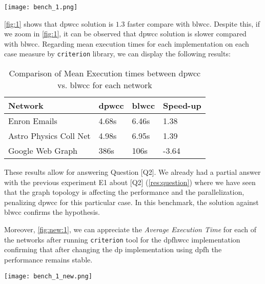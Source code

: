 \begin{minipage}[t]{\linewidth}
  \texttt{[image: bench\_1.png]}
  \captionsetup{type=figure}
  \label{fig:1}
\end{minipage}

\autoref{fig:1} shows that \acrshort{dpwcc} solution is $1.3$ faster compare with \acrshort{blwcc}. 
Despite this, if we zoom  in \autoref{fig:1}, it can be observed that \acrshort{dpwcc} solution is slower compared with \acrshort{blwcc}.
Regarding mean execution times for each implementation on each case measure by \texttt{criterion} library, we can display the following results:

\begin{table}[H]
  \centering
  \begin{tabular}{|l|l|l|l|}
   \hline
   \textbf{Network} & \textbf{\acrshort{dpwcc}} & \textbf{\acrshort{blwcc}} & \textbf{Speed-up}\\
   \hline
   Enron Emails & 4.68s &  6.46s & 1.38\\
   \hline
   Astro Physics Coll Net & 4.98s & 6.95s  & 1.39\\
   \hline
   Google Web Graph & 386s & 106s & -3.64\\
   \hline
  \end{tabular}
 \caption{Comparison of Mean Execution times between \acrshort{dpwcc} vs. \acrshort{blwcc} for each network}
 \label{table:6}
 \end{table}

These results allow for answering Question [Q2].
We already had a partial answer with the previous experiment E1 about [Q2] (\autoref{res:question}) where we have seen that the graph topology is affecting the performance and the parallelization, penalizing \acrshort{dpwcc} for this particular case. 
In this benchmark, the solution against \acrshort{blwcc} confirms the hypothesis. 

Moreover, \autoref{fig:new:1}, we can appreciate the \textit{Average Execution Time} for each of the networks after running \texttt{criterion} tool for the \acrshort{dpfhwcc} implementation confirming that after changing the \acrshort{dp} implementation using \acrshort{dpfh} the performance remains stable.

\begin{minipage}[t]{\linewidth}
  \texttt{[image: bench\_1\_new.png]}
  \captionsetup{type=figure}
  \label{fig:new:1}
\end{minipage}

